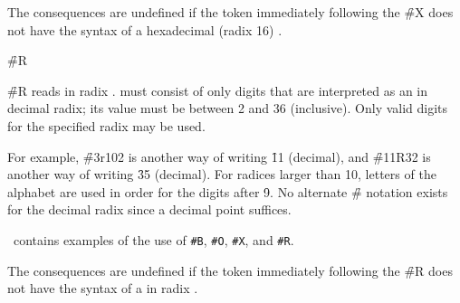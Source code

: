 The consequences are undefined if the token immediately following
the \f{\#X} does not have the syntax of a hexadecimal (\ie radix 16) .

\endsubsubsection%


\f{\#R}
                                                             
\f{\#R} reads  in radix .
 must consist of only digits
that are interpreted as an 
in decimal radix; its value must be between 2 and 36 (inclusive).
Only valid digits
for the specified radix may be used.

For example, \f{\#3r102} is another way of writing \f{11} (decimal), 
and \f{\#11R32}
is another way of writing \f{35} (decimal).  
For radices larger than 10, letters of
the alphabet are used in order for the digits after \f{9}.
No alternate \f{\#} notation exists for the decimal radix since a
decimal point suffices.

\Thenextfigure\ contains examples of the use of {\tt\#B},
{\tt \#O}, {\tt \#X}, and {\tt \#R}.


The consequences are undefined if the token immediately following
the \f{\#R} does not have the syntax of a  in radix .

\endsubsubsection%


